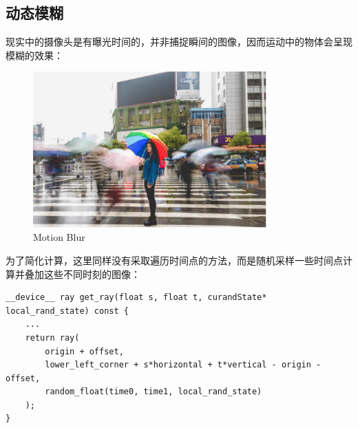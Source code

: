 \documentclass[UTF8, a4paper, 11pt]{article}
\begin{document}
\subsection{动态模糊}
现实中的摄像头是有曝光时间的，并非捕捉瞬间的图像，因而运动中的物体会呈现模糊的效果：
\begin{figure}[H]
    \centering
    \includegraphics[width=0.8\textwidth]{motion_blur.png}
    \caption{Motion Blur}
\end{figure}
为了简化计算，这里同样没有采取遍历时间点的方法，而是随机采样一些时间点计算并叠加这些不同时刻的图像：
\begin{lstlisting}
__device__ ray get_ray(float s, float t, curandState* local_rand_state) const {
    ...
    return ray(
        origin + offset,
        lower_left_corner + s*horizontal + t*vertical - origin - offset,
        random_float(time0, time1, local_rand_state)
    );
}
\end{lstlisting}
\end{document}
